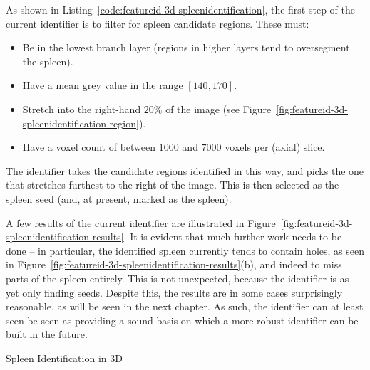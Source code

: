 As shown in Listing~\ref{code:featureid-3d-spleenidentification}, the first step of the current identifier is to filter for spleen candidate regions. These must:
%
\begin{itemize}
\item Be in the lowest branch layer (regions in higher layers tend to oversegment the spleen).
\item Have a mean grey value in the range $[140,170]$.
\item Stretch into the right-hand $20\%$ of the image (see Figure~\ref{fig:featureid-3d-spleenidentification-region}).
\item Have a voxel count of between $1000$ and $7000$ voxels per (axial) slice.
\end{itemize}
%
The identifier takes the candidate regions identified in this way, and picks the one that stretches furthest to the right of the image. This is then selected as the spleen seed (and, at present, marked as the spleen).

A few results of the current identifier are illustrated in Figure~\ref{fig:featureid-3d-spleenidentification-results}. It is evident that much further work needs to be done -- in particular, the identified spleen currently tends to contain holes, as seen in Figure~\ref{fig:featureid-3d-spleenidentification-results}(b), and indeed to miss parts of the spleen entirely. This is not unexpected, because the identifier is as yet only finding seeds. Despite this, the results are in some cases surprisingly reasonable, as will be seen in the next chapter. As such, the identifier can at least seen be seen as providing a sound basis on which a more robust identifier can be built in the future.

\begin{stulisting}[p]
\caption{Spleen Identification in 3D}
\label{code:featureid-3d-spleenidentification}

\end{stulisting}

